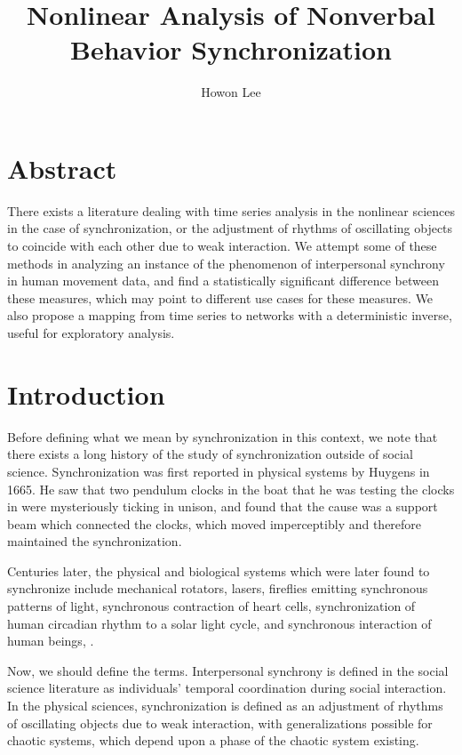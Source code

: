 \documentclass[12pt]{article}
\begin{document}
\title{Nonlinear Analysis of Nonverbal Behavior Synchronization}
\author{Howon Lee}
\maketitle

\section{Abstract}
There exists a literature dealing with time series analysis in the nonlinear sciences in the case of synchronization, or the adjustment of rhythms of oscillating objects to coincide with each other due to weak interaction. We attempt some of these methods in analyzing an instance of the phenomenon of interpersonal synchrony in human movement data, and find a statistically significant difference between these measures, which may point to different use cases for these measures. We also propose a mapping from time series to networks with a deterministic inverse, useful for exploratory analysis.

\section{Introduction}

Before defining what we mean by synchronization in this context, we note that there exists a long history of the study of synchronization outside of social science. Synchronization was first reported in physical systems by Huygens in 1665. He saw that two pendulum clocks in the boat that he was testing the clocks in were mysteriously ticking in unison, and found that the cause was a support beam which connected the clocks, which moved imperceptibly and therefore maintained the synchronization\cite{physsync}.

Centuries later, the physical and biological systems which were later found to synchronize include mechanical rotators, lasers, fireflies emitting synchronous patterns of light, synchronous contraction of heart cells, synchronization of human circadian rhythm to a solar light cycle, and synchronous interaction of human beings\cite{syncreview}, \cite{physsync}.

Now, we should define the terms. Interpersonal synchrony is defined in the social science literature as individuals' temporal coordination during social interaction\cite{socialsync}. In the physical sciences, synchronization is defined as an adjustment of rhythms of oscillating objects due to weak interaction, with generalizations possible for chaotic systems, which depend upon a phase of the chaotic system existing\cite{physsync}.
\end{document}
